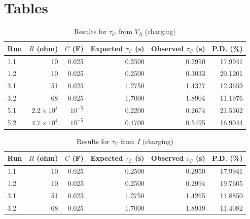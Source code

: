 \section{Tables}
\begin{table}[ht!]
    \begin{center}
        \begin{tabular}{|l|r|r|r|r|r|}
            \hline
            Run & $R$ (ohm) & $C$ (F) & Expected $\tau_{C}$ (s) & Observed $\tau_{C}$ (s) & P.D. (\%) \\
            \hline
            1.1 & 10 & 0.025 & 0.2500 & 0.2950 & 17.9941 \\
            1.2 & 10 & 0.025 & 0.2500 & 0.3033 & 20.1201 \\
            3.1 & 51 & 0.025 & 1.2750 & 1.4327 & 12.3659 \\
            3.2 & 68 & 0.025 & 1.7000 & 1.8904 & 11.1976 \\
            5.1 & $2.2 \times 10^{4}$ & $10^{-5}$ & 0.2200 & 0.2674 & 21.5362 \\
            5.2 & $4.7 \times 10^{4}$ & $10^{-5}$ & 0.4700 & 0.5495 & 16.9044 \\
            \hline
        \end{tabular}
    \end{center}
    \caption{Results for $\tau_{C}$ from $V_{R}$ (charging)}
\end{table}
\begin{table}[ht!]
    \begin{center}
        \begin{tabular}{|l|r|r|r|r|r|}
            \hline
            Run & $R$ (ohm) & $C$ (F) & Expected $\tau_{C}$ (s) & Observed $\tau_{C}$ (s) & P.D. (\%) \\
            \hline
            1.1 & 10 & 0.025 & 0.2500 & 0.2950 & 17.9941 \\
            1.2 & 10 & 0.025 & 0.2500 & 0.2994 & 19.7605 \\
            3.1 & 51 & 0.025 & 1.2750 & 1.4265 & 11.8850 \\
            3.2 & 68 & 0.025 & 1.7000 & 1.8939 & 11.4082 \\
            \hline
        \end{tabular}
    \end{center}
    \caption{Results for $\tau_{C}$ from $I$ (charging)}
\end{table}
